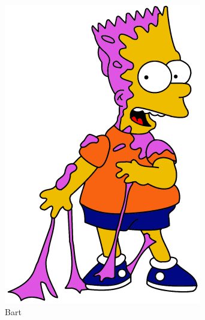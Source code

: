 \documentclass[paper=a4, fontsize=11pt]{scrartcl} %
\numberwithin{equation}{section} %
\numberwithin{figure}{section} %
\numberwithin{table}{section} %
\begin{document}
\begin{figure}
    \centering
    \begin{subfigure}[b]{0.15\textwidth}
        \includegraphics[width=\textwidth]{bart001}
        \caption{Bart}
        \label{fig:bart}
    \end{subfigure}
    ~ %
    \begin{subfigure}[b]{0.15\textwidth}

\end{subfigure}
\end{figure}
\end{document}
